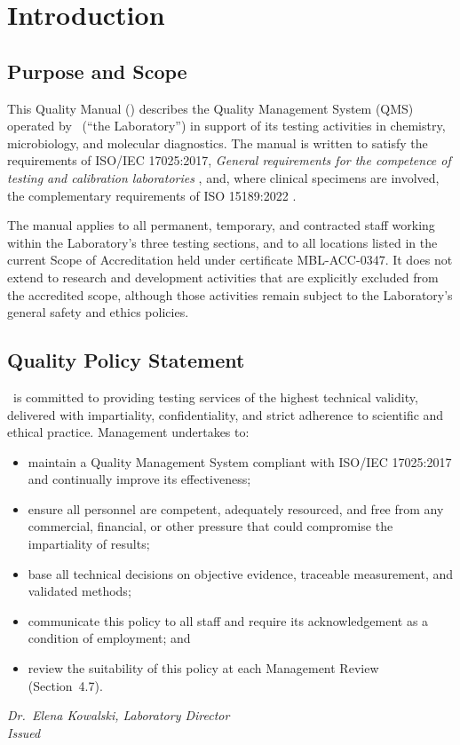 
\section{Introduction}

\subsection{Purpose and Scope}

This Quality Manual (\doccode) describes the Quality Management System (QMS) operated by
\labname\ (``the Laboratory'') in support of its testing activities in chemistry,
microbiology, and molecular diagnostics. The manual is written to satisfy the requirements
of ISO/IEC 17025:2017, \emph{General requirements for the competence of testing and
calibration laboratories} \cite{iso17025}, and, where clinical specimens are involved, the
complementary requirements of ISO 15189:2022 \cite{iso15189}.

The manual applies to all permanent, temporary, and contracted staff working within the
Laboratory's three testing sections, and to all locations listed in the current Scope of
Accreditation held under certificate MBL-ACC-0347. It does not extend to research and
development activities that are explicitly excluded from the accredited scope, although
those activities remain subject to the Laboratory's general safety and ethics policies.

\subsection{Quality Policy Statement}

\begin{policybox}
\labname\ is committed to providing testing services of the highest technical validity,
delivered with impartiality, confidentiality, and strict adherence to scientific and
ethical practice. Management undertakes to:
\begin{itemize}
  \item maintain a Quality Management System compliant with ISO/IEC 17025:2017 and continually
        improve its effectiveness;
  \item ensure all personnel are competent, adequately resourced, and free from any commercial,
        financial, or other pressure that could compromise the impartiality of results;
  \item base all technical decisions on objective evidence, traceable measurement, and validated
        methods;
  \item communicate this policy to all staff and require its acknowledgement as a condition of
        employment; and
  \item review the suitability of this policy at each Management Review (Section~4.7).
\end{itemize}
\medskip
\hfill \emph{Dr.\ Elena Kowalski, Laboratory Director} \\
\hfill \emph{Issued \doceffective}
\end{policybox}

